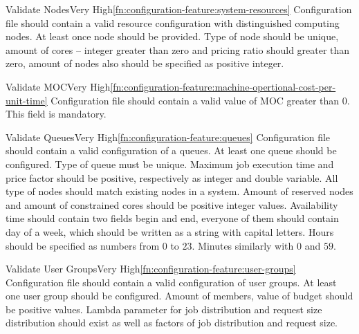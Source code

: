 	\begin{functional}{Validate Nodes}{Very High}{\ref{fn:configuration-feature:system-resources}}
		\label{fn:configuration-feature:valid-nodes}
		{
			Configuration file should contain a valid resource configuration with distinguished \gls{computing node}s. At least once node should be provided. Type of node should be unique, amount of cores -- integer greater than zero and pricing ratio should greater than zero, amount of nodes also should be specified as positive integer.  
		}
	\end{functional}

	\begin{functional}{Validate \gls{MOC}}{Very High}{\ref{fn:configuration-feature:machine-opertional-cost-per-unit-time}}
		\label{fn:configuration-feature:valid-moc}
		{
			Configuration file should contain a valid value of \gls{MOC} greater than $0$. This field is mandatory.
		}
	\end{functional}

	\begin{functional}{Validate Queues}{Very High}{\ref{fn:configuration-feature:queues}}
		\label{fn:configuration-feature:valid-queues}
		{
			Configuration file should contain a valid configuration of a queues. At least one queue should be configured.
			Type of queue must be unique. Maximum job execution time and price factor should be positive, respectively as integer and double variable. All type of nodes should match existing nodes in a system. Amount of reserved nodes and amount of constrained cores should be positive integer values. Availability time should contain two fields begin and end, everyone of them should contain day of a week, which should be written as a string with capital letters. Hours should be specified as numbers from $0$ to $23$. Minutes similarly with $0$ and $59$.
		}
	\end{functional}

	\begin{functional}{Validate User Groups}{Very High}{\ref{fn:configuration-feature:user-groups}}
		\label{fn:configuration-feature:valid-user-groups}
		{
			Configuration file should contain a valid configuration of user groups. At least one user group should be configured. Amount of members, value of budget should be positive values. Lambda parameter for job distribution and request size distribution should exist as well as factors of job distribution and request size. 
		}
	\end{functional}

